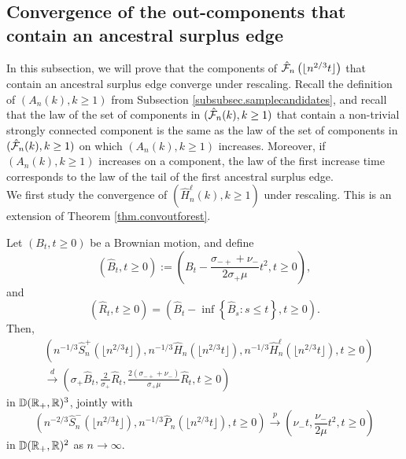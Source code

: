 \subsection{Convergence of the out-components that contain an ancestral surplus edge}\label{subsec.ancestral}
In this subsection, we will prove that the components of $\hat{{\mathcal F}}_n\left(\lfloor n^{2/3}t\rfloor\right)$ that contain an ancestral surplus edge converge under rescaling. Recall the definition of $(A_n(k),k\geq 1)$ from Subsection \ref{subsubsec.samplecandidates}, and recall that the law of the set of components in $(\hat{{\mathcal F}}_n(k),k\geq 1)$ that contain a non-trivial strongly connected component is the same as the law of the set of components in $(\hat{{\mathcal F}}_n(k),k\geq 1)$ on which $(A_n(k),k\geq 1)$ increases. Moreover, if $(A_n(k),k\geq 1)$ increases on a component, the law of the first increase time corresponds to the law of the tail of the first ancestral surplus edge. \\
We first study the convergence of $(\hat{H}_n^\ell(k),k\geq 1)$ under rescaling. This is an extension of Theorem \ref{thm.convoutforest}.
\begin{lemma}\label{lemma.heightprocesswithlengths}
Let $(B_t, t\geq 0)$ be a Brownian motion, and define
$$(\hat{B}_t,t\geq 0):=\left( B_t-\frac{\sigma_{-+}+\nu_-}{2\sigma_+ \mu}t^2, t\geq 0\right),$$ and $$(\hat{R}_t,t\geq 0)=\left(\hat{B}_t-\inf\left\{\hat{B}_s: s\leq t\right\},t\geq 0\right).$$ 
Then,
\begin{align*}&\left(n^{-1/3}\hat{S}^{+}_n\left(\lfloor n^{2/3}t\rfloor \right),n^{-1/3}\hat{H}_{n}\left(\lfloor n^{2/3}t\rfloor \right),n^{-1/3}\hat{H}^\ell_{n}\left(\lfloor n^{2/3}t\rfloor \right),  t\geq 0\right)\\
&\overset{d}{\to}\left(\sigma_+ \hat{B}_t, \frac{2}{\sigma_+} \hat{R}_t,\frac{2(\sigma_{-+}+\nu_-)}{\sigma_+\mu} \hat{R}_t, t\geq 0\right)\end{align*}
in ${\mathbb D}({\mathbb R}_+,{\mathbb R})^3$,
jointly with 
$$\left(n^{-2/3}\hat{S}_n^-\left(\lfloor n^{2/3}t\rfloor \right), n^{-1/3}\hat{P}_n\left(\lfloor n^{2/3}t\rfloor \right),t\geq 0\right)\overset{p}{\to}\left(\nu_-t,  \frac{\nu_-}{2\mu} t^2, t\geq 0\right)$$
in ${\mathbb D}({\mathbb R}_+,{\mathbb R})^2$ as $n\to \infty$.
\end{lemma}
